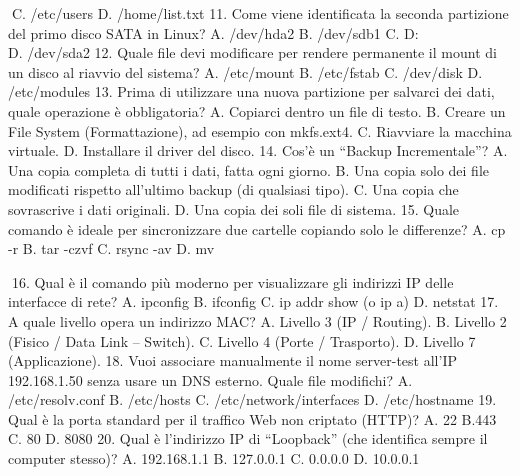 \documentclass[11pt,a4paper]{article}
\begin{document}
C. /etc/users D. /home/list.txt 11. Come viene identificata la seconda
partizione del primo disco SATA in Linux? A. /dev/hda2 B. /dev/sdb1 C.
D:\\
D. /dev/sda2 12. Quale file devi modificare per rendere permanente il
mount di un disco al riavvio del sistema? A. /etc/mount B. /etc/fstab C.
/dev/disk D. /etc/modules 13. Prima di utilizzare una nuova partizione
per salvarci dei dati, quale operazione è obbligatoria? A. Copiarci
dentro un file di testo. B. Creare un File System (Formattazione), ad
esempio con mkfs.ext4. C. Riavviare la macchina virtuale. D. Installare
il driver del disco. 14. Cos'è un ``Backup Incrementale''? A. Una copia
completa di tutti i dati, fatta ogni giorno. B. Una copia solo dei file
modificati rispetto all'ultimo backup (di qualsiasi tipo). C. Una copia
che sovrascrive i dati originali. D. Una copia dei soli file di sistema.
15. Quale comando è ideale per sincronizzare due cartelle copiando solo
le differenze? A. cp -r B. tar -czvf C. rsync -av D. mv

16. Qual è il comando più moderno per visualizzare gli indirizzi IP
delle interfacce di rete? A. ipconfig B. ifconfig C. ip addr show (o ip
a) D. netstat 17. A quale livello opera un indirizzo MAC? A. Livello 3
(IP / Routing). B. Livello 2 (Fisico / Data Link -- Switch). C. Livello
4 (Porte / Trasporto). D. Livello 7 (Applicazione). 18. Vuoi associare
manualmente il nome server-test all'IP 192.168.1.50 senza usare un DNS
esterno. Quale file modifichi? A. /etc/resolv.conf B. /etc/hosts C.
/etc/network/interfaces D. /etc/hostname 19. Qual è la porta standard
per il traffico Web non criptato (HTTP)? A. 22 B.443 C. 80 D. 8080 20.
Qual è l'indirizzo IP di ``Loopback'' (che identifica sempre il computer
stesso)? A. 192.168.1.1 B. 127.0.0.1 C. 0.0.0.0 D. 10.0.0.1


\end{document}
